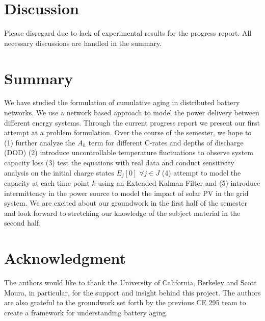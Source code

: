 \documentclass[10]{IEEEtran}
\begin{document}
	\section{Discussion}
	Please disregard due to lack of experimental results for the progress report. All necessary discussions are handled in the summary.
	
	\section{Summary}
	We have studied the formulation of cumulative aging in distributed battery networks. We use a network based approach to model the power delivery between different energy systems. Through the current progress report we present our first attempt at a problem formulation. Over the course of the semester, we hope to (1) further analyze the $A_h$ term for different C-rates and depths of discharge (DOD) (2) introduce uncontrollable temperature fluctuations to observe system capacity loss (3) test the equations with real data and conduct sensitivity analysis on the initial charge states $E_j[0] \; \forall j\in J$ (4) attempt to model the capacity at each time point $k$ using an Extended Kalman Filter\cite{b8} and (5) introduce intermittency in the power source to model the impact of solar PV in the grid system. We are excited about our groundwork in the first half of the semester and look forward to stretching our knowledge of the subject material in the second half.
	
	\section*{Acknowledgment}
	The authors would like to thank the University of California, Berkeley and Scott Moura, in particular, for the support and insight behind this project. The authors are also grateful to the groundwork set forth by the previous CE 295 team to create a framework for understanding battery aging.
	
\end{document}
